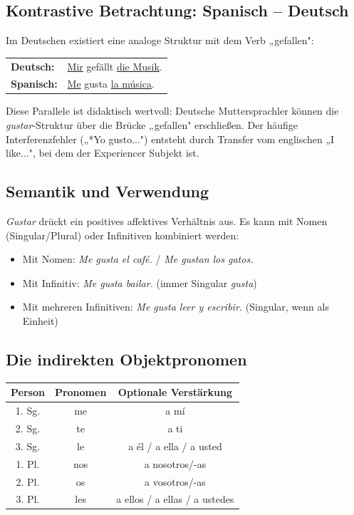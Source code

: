 \documentclass[11pt, a4paper]{article}
\newcommand{\es}[1]{\textcolor{spanisch}{\textit{#1}}}
\begin{document}
\subsection{Kontrastive Betrachtung: Spanisch -- Deutsch}

Im Deutschen existiert eine analoge Struktur mit dem Verb „gefallen":

\begin{center}
\begin{tabular}{ll}
    \textbf{Deutsch:} & \underline{Mir} gefällt \underline{die Musik}. \\
    \textbf{Spanisch:} & \underline{Me} gusta \underline{la música}. \\
\end{tabular}
\end{center}

Diese Parallele ist didaktisch wertvoll: Deutsche Muttersprachler können die \es{gustar}-Struktur über die Brücke „gefallen" erschließen. Der häufige Interferenzfehler („*Yo gusto...") entsteht durch Transfer vom englischen „I like...", bei dem der Experiencer Subjekt ist.

\subsection{Semantik und Verwendung}

\es{Gustar} drückt ein positives affektives Verhältnis aus. Es kann mit Nomen (Singular/Plural) oder Infinitiven kombiniert werden:

\begin{itemize}[leftmargin=2em]
    \item Mit Nomen: \es{Me gusta el café.} / \es{Me gustan los gatos.}
    \item Mit Infinitiv: \es{Me gusta bailar.} (immer Singular \es{gusta})
    \item Mit mehreren Infinitiven: \es{Me gusta leer y escribir.} (Singular, wenn als Einheit)
\end{itemize}

\subsection{Die indirekten Objektpronomen}

\begin{center}
\begin{tabular}{|c|c|c|}
    \hline
    \textbf{Person} & \textbf{Pronomen} & \textbf{Optionale Verstärkung} \\
    \hline
    1. Sg. & me & a mí \\
    2. Sg. & te & a ti \\
    3. Sg. & le & a él / a ella / a usted \\
    1. Pl. & nos & a nosotros/-as \\
    2. Pl. & os & a vosotros/-as \\
    3. Pl. & les & a ellos / a ellas / a ustedes \\
    \hline
\end{tabular}
\end{center}
\end{document}
